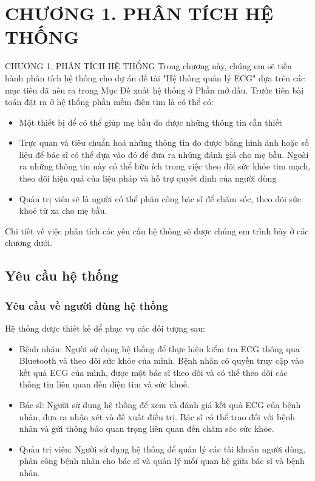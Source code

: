 
\section*{CHƯƠNG 1. PHÂN TÍCH HỆ THỐNG}
\setcounter{section}{1}
\setcounter{subsection}{0} %
\setcounter{table}{0} %
\setcounter{figure}{0} %
{\numberline{}CHƯƠNG 1. PHÂN TÍCH HỆ THỐNG}
Trong chương này, chúng em sẽ tiến hành phân tích hệ thống cho dự án đề tài "Hệ thống quản lý ECG" dựa trên các mục tiêu
đã nêu ra trong Mục Đề xuất hệ thống ở Phần mở đầu. Trước tiên bài toán đặt ra ở hệ thống phần mềm điện tim là có thể có:
\begin{adjustwidth}{1.5em}{}
\begin{itemize}
  \item Một thiết bị để có thể giúp mẹ bầu đo được những thông tin cần thiết
  \item Trực quan và tiêu chuẩn hoá những thông tin đo được
    bằng hình ảnh hoặc số liệu để bác sĩ có thể dựa vào đó để đưa ra những đánh giá cho mẹ bầu. Ngoài ra những thông tin này
    có thể hữu ích trong việc theo dõi sức khỏe tim mạch, theo dõi hiệu quả của liệu pháp 
    và hỗ trợ quyết định của người dùng
  \item Quản trị viên sẽ là người có thể phân công bác sĩ để chăm sóc, theo dõi sức khoẻ từ
  xa cho mẹ bầu. 
\end{itemize}
\end{adjustwidth}
Chi tiết về việc phân tích các yêu cầu hệ thống sẽ được chúng em trình bày ở các chương dưới.


\subsection{Yêu cầu hệ thống}
\subsubsection{Yêu cầu về người dùng hệ thống}
Hệ thống được thiết kế để phục vụ các đối tượng sau:
\begin{adjustwidth}{1.5em}{}
\begin{itemize}
    \item Bệnh nhân: Người sử dụng hệ thống để thực hiện kiểm tra ECG thông qua Bluetooth và theo dõi sức khỏe của mình. Bệnh nhân có quyền truy cập vào kết quả ECG của mình, được một bác sĩ theo dõi và có thể theo dõi các thông tin liên quan đến điện tim và sức khoẻ.
    \item Bác sĩ: Người sử dụng hệ thống để xem và đánh giá kết quả ECG của bệnh nhân, đưa ra nhận xét và đề xuất điều trị. Bác sĩ có thể trao đổi với bệnh nhân và gửi thông báo quan trọng liên quan đến chăm sóc sức khỏe.
    \item Quản trị viên: Người sử dụng hệ thống để quản lý các tài khoản người dùng, phân công bệnh nhân cho bác sĩ và quản lý mối quan hệ giữa bác sĩ và bệnh nhân.
\end{itemize}
\end{adjustwidth}

